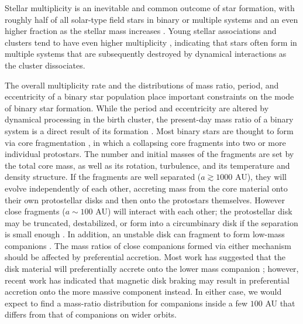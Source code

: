 \documentclass{emulateapj}
\begin{document}
\label{sec:intro}

Stellar multiplicity is an inevitable and common outcome of star formation, with roughly half of all solar-type field stars in binary or multiple systems \citep{Raghavan2010} and an even higher fraction as the stellar mass increases \citep{Zinnecker2007}. Young stellar associations and clusters tend to have even higher multiplicity \citep{Duchene2013}, indicating that stars often form in multiple systems that are subsequently destroyed by dynamical interactions as the cluster dissociates. 

The overall multiplicity rate and the distributions of mass ratio, period, and eccentricity of a binary star population place important constraints on the mode of binary star formation. While the period and eccentricity are altered by dynamical processing in the birth cluster, the present-day mass ratio of a binary system is a direct result of its formation \citep{Parker2013}. Most binary stars are thought to form via core fragmentation \citep{Boss1979, Boss1986, Bate1995}, in which a collapsing core fragments into two or more individual protostars. The number and initial masses of the fragments are set by the total core mass, as well as its rotation, turbulence, and its temperature and density structure. If the fragments are well separated ($a \gtrsim 1000$ AU), they will evolve independently of each other, accreting mass from the core material onto their own protostellar disks and then onto the protostars themselves. However close fragments ($a \sim 100$ AU) will interact with each other; the protostellar disk may be truncated, destabilized, or form into a circumbinary disk if the separation is small enough \citep{Bate1997}. In addition, an unstable disk can fragment to form low-mass companions \citep{Kratter2006, Stamatellos2011}. The mass ratios of close companions formed via either mechanism should be affected by preferential accretion. Most work has suggested that the disk material will preferentially accrete onto the lower mass companion \citep{Bate1997, BBB2002}; however, recent work has indicated that magnetic disk braking may result in preferential accretion onto the more massive component \citep{Zhao2013} instead. In either case, we would expect to find a mass-ratio distribution for companions inside a few $100$ AU that differs from that of companions on wider orbits.
\end{document}
